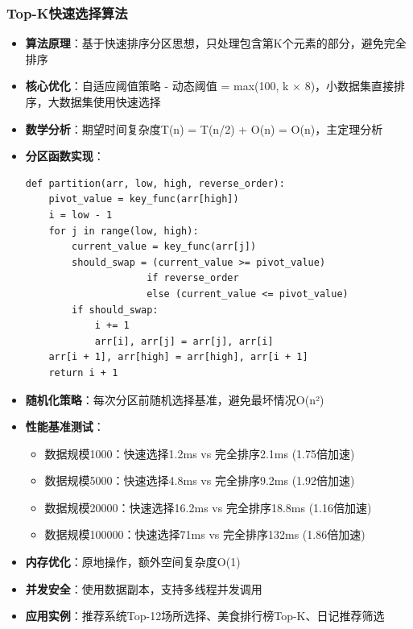 \documentclass[12pt,a4paper]{article}
\begin{document}
\subsubsection{Top-K快速选择算法}
\begin{itemize}
    \item \textbf{算法原理}：基于快速排序分区思想，只处理包含第K个元素的部分，避免完全排序
    \item \textbf{核心优化}：自适应阈值策略 - 动态阈值 = max(100, k × 8)，小数据集直接排序，大数据集使用快速选择
    \item \textbf{数学分析}：期望时间复杂度T(n) = T(n/2) + O(n) = O(n)，主定理分析
    \item \textbf{分区函数实现}：
    \begin{verbatim}
def partition(arr, low, high, reverse_order):
    pivot_value = key_func(arr[high])
    i = low - 1
    for j in range(low, high):
        current_value = key_func(arr[j])
        should_swap = (current_value >= pivot_value) 
                     if reverse_order 
                     else (current_value <= pivot_value)
        if should_swap:
            i += 1
            arr[i], arr[j] = arr[j], arr[i]
    arr[i + 1], arr[high] = arr[high], arr[i + 1]
    return i + 1
    \end{verbatim}
    \item \textbf{随机化策略}：每次分区前随机选择基准，避免最坏情况O(n²)
    \item \textbf{性能基准测试}：
    \begin{itemize}
        \item 数据规模1000：快速选择1.2ms vs 完全排序2.1ms (1.75倍加速)
        \item 数据规模5000：快速选择4.8ms vs 完全排序9.2ms (1.92倍加速)
        \item 数据规模20000：快速选择16.2ms vs 完全排序18.8ms (1.16倍加速)
        \item 数据规模100000：快速选择71ms vs 完全排序132ms (1.86倍加速)
    \end{itemize}
    \item \textbf{内存优化}：原地操作，额外空间复杂度O(1)
    \item \textbf{并发安全}：使用数据副本，支持多线程并发调用
    \item \textbf{应用实例}：推荐系统Top-12场所选择、美食排行榜Top-K、日记推荐筛选
\end{itemize}
\end{document}
